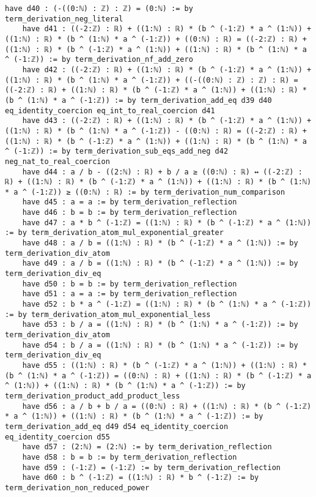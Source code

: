 \documentclass{article}
\begin{document}
\begin{tcolorbox}[colback=white!10, width=\linewidth]
\begin{lstlisting}[language=Lean4]
    have d40 : (-((0:ℕ) : ℤ) : ℤ) = (0:ℕ) := by term_derivation_neg_literal
    have d41 : ((-2:ℤ) : ℝ) + ((1:ℕ) : ℝ) * (b ^ (-1:ℤ) * a ^ (1:ℕ)) + ((1:ℕ) : ℝ) * (b ^ (1:ℕ) * a ^ (-1:ℤ)) + ((0:ℕ) : ℝ) = ((-2:ℤ) : ℝ) + ((1:ℕ) : ℝ) * (b ^ (-1:ℤ) * a ^ (1:ℕ)) + ((1:ℕ) : ℝ) * (b ^ (1:ℕ) * a ^ (-1:ℤ)) := by term_derivation_nf_add_zero
    have d42 : ((-2:ℤ) : ℝ) + ((1:ℕ) : ℝ) * (b ^ (-1:ℤ) * a ^ (1:ℕ)) + ((1:ℕ) : ℝ) * (b ^ (1:ℕ) * a ^ (-1:ℤ)) + ((-((0:ℕ) : ℤ) : ℤ) : ℝ) = ((-2:ℤ) : ℝ) + ((1:ℕ) : ℝ) * (b ^ (-1:ℤ) * a ^ (1:ℕ)) + ((1:ℕ) : ℝ) * (b ^ (1:ℕ) * a ^ (-1:ℤ)) := by term_derivation_add_eq d39 d40 eq_identity_coercion eq_int_to_real_coercion d41
    have d43 : ((-2:ℤ) : ℝ) + ((1:ℕ) : ℝ) * (b ^ (-1:ℤ) * a ^ (1:ℕ)) + ((1:ℕ) : ℝ) * (b ^ (1:ℕ) * a ^ (-1:ℤ)) - ((0:ℕ) : ℝ) = ((-2:ℤ) : ℝ) + ((1:ℕ) : ℝ) * (b ^ (-1:ℤ) * a ^ (1:ℕ)) + ((1:ℕ) : ℝ) * (b ^ (1:ℕ) * a ^ (-1:ℤ)) := by term_derivation_sub_eqs_add_neg d42 neg_nat_to_real_coercion
    have d44 : a / b - ((2:ℕ) : ℝ) + b / a ≥ ((0:ℕ) : ℝ) ↔ ((-2:ℤ) : ℝ) + ((1:ℕ) : ℝ) * (b ^ (-1:ℤ) * a ^ (1:ℕ)) + ((1:ℕ) : ℝ) * (b ^ (1:ℕ) * a ^ (-1:ℤ)) ≥ ((0:ℕ) : ℝ) := by term_derivation_num_comparison
    have d45 : a = a := by term_derivation_reflection
    have d46 : b = b := by term_derivation_reflection
    have d47 : a * b ^ (-1:ℤ) = ((1:ℕ) : ℝ) * (b ^ (-1:ℤ) * a ^ (1:ℕ)) := by term_derivation_atom_mul_exponential_greater
    have d48 : a / b = ((1:ℕ) : ℝ) * (b ^ (-1:ℤ) * a ^ (1:ℕ)) := by term_derivation_div_atom
    have d49 : a / b = ((1:ℕ) : ℝ) * (b ^ (-1:ℤ) * a ^ (1:ℕ)) := by term_derivation_div_eq
    have d50 : b = b := by term_derivation_reflection
    have d51 : a = a := by term_derivation_reflection
    have d52 : b * a ^ (-1:ℤ) = ((1:ℕ) : ℝ) * (b ^ (1:ℕ) * a ^ (-1:ℤ)) := by term_derivation_atom_mul_exponential_less
    have d53 : b / a = ((1:ℕ) : ℝ) * (b ^ (1:ℕ) * a ^ (-1:ℤ)) := by term_derivation_div_atom
    have d54 : b / a = ((1:ℕ) : ℝ) * (b ^ (1:ℕ) * a ^ (-1:ℤ)) := by term_derivation_div_eq
    have d55 : ((1:ℕ) : ℝ) * (b ^ (-1:ℤ) * a ^ (1:ℕ)) + ((1:ℕ) : ℝ) * (b ^ (1:ℕ) * a ^ (-1:ℤ)) = ((0:ℕ) : ℝ) + ((1:ℕ) : ℝ) * (b ^ (-1:ℤ) * a ^ (1:ℕ)) + ((1:ℕ) : ℝ) * (b ^ (1:ℕ) * a ^ (-1:ℤ)) := by term_derivation_product_add_product_less
    have d56 : a / b + b / a = ((0:ℕ) : ℝ) + ((1:ℕ) : ℝ) * (b ^ (-1:ℤ) * a ^ (1:ℕ)) + ((1:ℕ) : ℝ) * (b ^ (1:ℕ) * a ^ (-1:ℤ)) := by term_derivation_add_eq d49 d54 eq_identity_coercion eq_identity_coercion d55
    have d57 : (2:ℕ) = (2:ℕ) := by term_derivation_reflection
    have d58 : b = b := by term_derivation_reflection
    have d59 : (-1:ℤ) = (-1:ℤ) := by term_derivation_reflection
    have d60 : b ^ (-1:ℤ) = ((1:ℕ) : ℝ) * b ^ (-1:ℤ) := by term_derivation_non_reduced_power

\end{lstlisting}
\end{tcolorbox}
\end{document}
